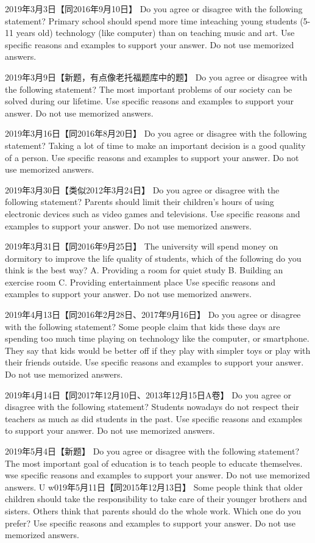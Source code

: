 2019年3月3日【同2016年9月10日】
Do you agree or disagree with the following statement?
Primary school should spend more time inteaching young students (5-11 years old) technology (like computer) than on teaching music and art.
Use specific reasons and examples to support your answer. Do not use memorized answers.

2019年3月9日【新题，有点像老托福题库中的题】
Do you agree or disagree with the following statement?
The most important problems of our society can be solved during our lifetime.
Use specific reasons and examples to support your answer. Do not use memorized answers.

2019年3月16日【同2016年8月20日】
Do you agree or disagree with the following statement?
Taking a lot of time to make an important decision is a good quality of a person.
Use specific reasons and examples to support your answer. Do not use memorized answers.

2019年3月30日【类似2012年3月24日】
Do you agree or disagree with the following statement?
Parents should limit their children's hours of using electronic devices such as video games and televisions.
Use specific reasons and examples to support your answer. Do not use memorized answers.

2019年3月31日【同2016年9月25日】
The university will spend money on dormitory to improve the life quality of students, which of the following do you think is the best way?
A. Providing a room for quiet study
B. Building an exercise room
C. Providing entertainment place
Use specific reasons and examples to support your answer. Do not use memorized answers.

2019年4月13日【同2016年2月28日、2017年9月16日】
Do you agree or disagree with the following statement?
Some people claim that kids these days are spending too much time playing on technology like the computer, or smartphone. They say that kids would be better off if they play with simpler toys or play with their friends outside.
Use specific reasons and examples to support your answer. Do not use memorized answers.



2019年4月14日【同2017年12月10日、2013年12月15日A卷】
Do you agree or disagree with the following statement?
Students nowadays do not respect their teachers as much as did students in the past.
Use specific reasons and examples to support your answer. Do not use memorized answers.

2019年5月4日【新题】
Do you agree or disagree with the following statement?
The most important goal of education is to teach people to educate themselves.
wse specific reasons and examples to support your answer. Do not use memorized answers.
U
w019年5月11日【同2015年12月13日】
Some people think that older children should take the responsibility to take care of their younger brothers and sisters. Others think that parents should do the whole work. Which one do you prefer?
Use specific reasons and examples to support your answer. Do not use memorized answers.

